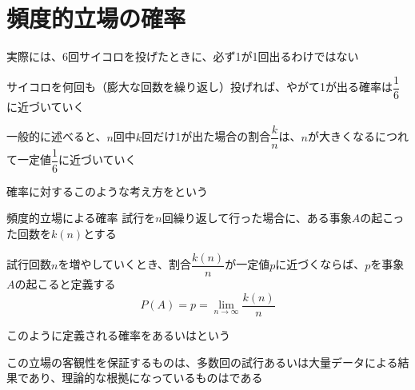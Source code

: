 \documentclass[../../../topic_probability-statistics]{subfiles}
\begin{document}
\sectionline
\section{頻度的立場の確率}

実際には、6回サイコロを投げたときに、必ず1が1回出るわけではない

\br

サイコロを何回も（膨大な回数を繰り返し）投げれば、やがて1が出る確率は$\dfrac{1}{6}$に近づいていく

\br

一般的に述べると、$n$回中$k$回だけ1が出た場合の割合$\dfrac{k}{n}$は、$n$が大きくなるにつれて一定値$\dfrac{1}{6}$に近づいていく

確率に対するこのような考え方をという

\begin{definition}{頻度的立場による確率}
  試行を$n$回繰り返して行った場合に、ある事象$A$の起こった回数を$k(n)$とする

  \br

  試行回数$n$を増やしていくとき、割合$\dfrac{k(n)}{n}$が一定値$p$に近づくならば、$p$を事象$A$の起こると定義する
  \begin{equation*}
    P(A) = p = \lim_{n \to \infty} \frac{k(n)}{n}
  \end{equation*}

  このように定義される確率をあるいはという
\end{definition}

\br

この立場の客観性を保証するものは、多数回の試行あるいは大量データによる結果であり、理論的な根拠になっているものはである
\end{document}
